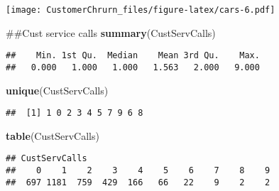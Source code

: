 \documentclass[]{article}
\newenvironment{Shaded}{\begin{snugshade}}{\end{snugshade}}
\newcommand{\KeywordTok}[1]{\textcolor[rgb]{0.13,0.29,0.53}{\textbf{#1}}}
\newcommand{\DataTypeTok}[1]{\textcolor[rgb]{0.13,0.29,0.53}{#1}}
\newcommand{\DecValTok}[1]{\textcolor[rgb]{0.00,0.00,0.81}{#1}}
\newcommand{\StringTok}[1]{\textcolor[rgb]{0.31,0.60,0.02}{#1}}
\newcommand{\CommentTok}[1]{\textcolor[rgb]{0.56,0.35,0.01}{\textit{#1}}}
\newcommand{\OperatorTok}[1]{\textcolor[rgb]{0.81,0.36,0.00}{\textbf{#1}}}
\newcommand{\NormalTok}[1]{#1}
\begin{document}
\texttt{[image: CustomerChrurn\_files/figure-latex/cars-6.pdf]}

\begin{Shaded}
\begin{Highlighting}[]
\NormalTok{##Cust service calls }
\KeywordTok{summary}\NormalTok{(CustServCalls)}
\end{Highlighting}
\end{Shaded}

\begin{verbatim}
##    Min. 1st Qu.  Median    Mean 3rd Qu.    Max. 
##   0.000   1.000   1.000   1.563   2.000   9.000
\end{verbatim}

\begin{Shaded}
\begin{Highlighting}[]
\KeywordTok{unique}\NormalTok{(CustServCalls)}
\end{Highlighting}
\end{Shaded}

\begin{verbatim}
##  [1] 1 0 2 3 4 5 7 9 6 8
\end{verbatim}

\begin{Shaded}
\begin{Highlighting}[]
\KeywordTok{table}\NormalTok{(CustServCalls)}
\end{Highlighting}
\end{Shaded}

\begin{verbatim}
## CustServCalls
##    0    1    2    3    4    5    6    7    8    9 
##  697 1181  759  429  166   66   22    9    2    2
\end{verbatim}

\begin{Shaded}
\end{Shaded}
\end{document}
